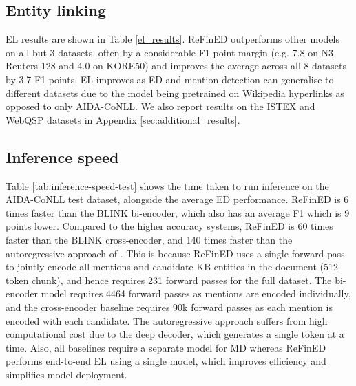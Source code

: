 \documentclass[11pt]{article}
\begin{document}
\subsection{Entity linking}
EL results are shown in Table \ref{el_results}. ReFinED outperforms other models on all but 3 datasets, often by a considerable F1 point margin (e.g. 7.8 on N3-Reuters-128 and 4.0 on KORE50) and improves the average across all 8 datasets by 3.7 F1 points.
EL improves as ED and mention detection can generalise to different datasets due to the model being pretrained on Wikipedia hyperlinks as opposed to only AIDA-CoNLL. We also report results on the ISTEX and WebQSP datasets in Appendix \ref{sec:additional_results}.














\subsection{Inference speed} \label{speed_test}

Table \ref{tab:inference-speed-test} shows the time taken to run inference on the AIDA-CoNLL test dataset, alongside the average ED performance. ReFinED is 6 times faster than the BLINK \cite{wu-etal-2020-scalable} bi-encoder, which also has an average F1 which is 9 points lower. Compared to the higher accuracy systems, ReFinED is 60 times faster than the BLINK cross-encoder, and 140 times faster than the autoregressive approach of \citet{Cao2020AutoregressiveER}. This is because ReFinED uses a single forward pass to jointly encode all mentions and candidate KB entities in the document (512 token chunk), and hence requires  231 forward passes for the full dataset. The bi-encoder model requires  4464 forward passes as mentions are encoded individually, and the cross-encoder baseline requires  90k forward passes as each mention is encoded with each candidate. The autoregressive approach suffers from high computational cost due to the deep decoder, which generates a single token at a time. Also, all baselines require a separate model for MD whereas ReFinED performs end-to-end EL using a single model, which improves efficiency and simplifies model deployment.
\end{document}
